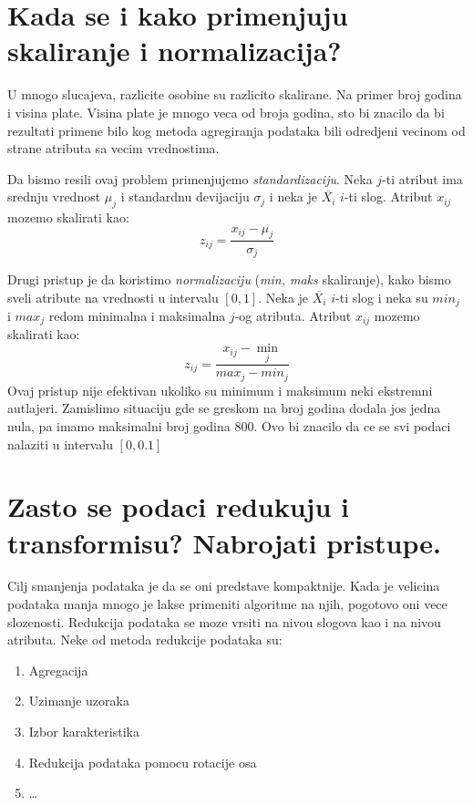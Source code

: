 \documentclass[a4paper]{article}
\begin{document}
\section{Kada se i kako primenjuju skaliranje i normalizacija?}
U mnogo slucajeva, razlicite osobine su razlicito skalirane. Na primer broj godina i visina plate.
Visina plate je mnogo veca od broja godina, sto bi znacilo da bi rezultati primene bilo kog metoda
agregiranja podataka bili odredjeni vecinom od strane atributa sa vecim vrednostima.

Da bismo resili ovaj problem primenjujemo \emph{standardizaciju}. Neka \(j\)-ti atribut ima srednju
vrednost \(\mu_j\) i standardnu devijaciju \(\sigma_j\) i neka je \(\overline{X_i}\) \(i\)-ti slog.
Atribut \(x_{ij}\) mozemo skalirati kao:
\begin{equation}\label{eq:standardizacija}
    z_{ij} = \dfrac{x_{ij} - \mu_j}{\sigma_j}
\end{equation}

Drugi pristup je da koristimo \emph{normalizaciju} (\emph{min, maks} skaliranje), kako bismo sveli
atribute na vrednosti u intervalu \([0, 1]\). Neka je \(\overline{X_i}\) \(i\)-ti slog i neka su
\(min_j\) i \(max_j\) redom minimalna i maksimalna \(j\)-og atributa. Atribut \(x_{ij}\) mozemo
skalirati kao:
\begin{equation}\label{eq:normalizacija}
    z_{ij} = \dfrac{x_{ij} - \min_j}{max_j - min_j}
\end{equation}
Ovaj pristup nije efektivan ukoliko su minimum i maksimum neki ekstremni autlajeri. Zamislimo
situaciju gde se greskom na broj godina dodala jos jedna nula, pa imamo maksimalni broj godina 800.
Ovo bi znacilo da ce se svi podaci nalaziti u intervalu \([0, 0.1]\)


\section{Zasto se podaci redukuju i transformisu? Nabrojati pristupe.}
Cilj smanjenja podataka je da se oni predstave kompaktnije. Kada je velicina podataka manja mnogo je
lakse primeniti algoritme na njih, pogotovo oni vece slozenosti. Redukcija podataka se moze vrsiti
na nivou slogova kao i na nivou atributa. Neke od metoda redukcije podataka su:
\begin{enumerate}
    \item Agregacija
    \item Uzimanje uzoraka
    \item Izbor karakteristika
    \item Redukcija podataka pomocu rotacije osa
    \item \ldots
\end{enumerate}
\end{document}
